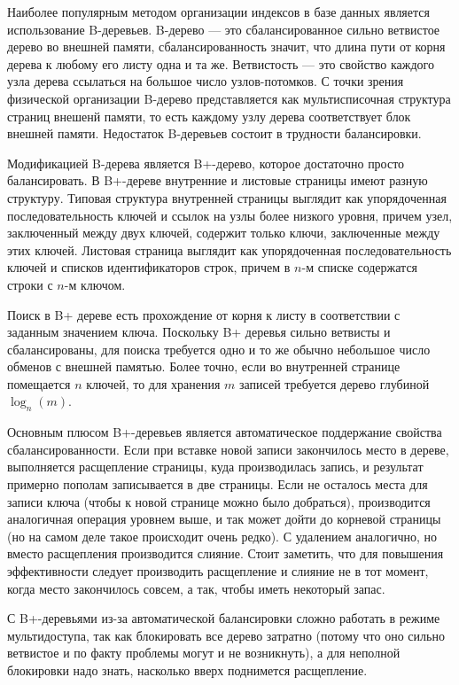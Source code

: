 \documentclass[a4paper,12pt]{article}
\begin{document}
Наиболее популярным методом организации индексов в базе данных является использование
B-деревьев. B-дерево — это сбалансированное сильно ветвистое дерево во внешней памяти,
сбалансированность значит, что длина пути от корня дерева к любому его листу одна и та же.
Ветвистость — это свойство каждого узла дерева ссылаться на большое число узлов-потомков.
С точки зрения физической организации B-дерево представляется как
мультисписочная структура страниц внешенй памяти, то есть каждому узлу дерева
соответствует блок внешней памяти. Недостаток B-деревьев состоит в трудности
балансировки.

Модификацией B-дерева является B+-дерево, которое достаточно просто балансировать. В
B+-дереве внутренние и листовые страницы имеют разную структуру. Типовая структура
внутренней страницы выглядит как упорядоченная последовательность ключей и ссылок на
узлы более низкого уровня, причем узел, заключенный между двух ключей, содержит только
ключи, заключенные между этих ключей. Листовая страница выглядит как упорядоченная
последовательность ключей и списков идентификаторов строк, причем в $n$-м списке
содержатся строки с $n$-м ключом.

Поиск в B+ дереве есть прохождение от корня к листу в соответствии с заданным значением
ключа. Поскольку B+ деревья сильно ветвисты и сбалансированы, для поиска требуется одно
и то же обычно небольшое число обменов с внешней памятью. Более точно, если во
внутренней странице помещается $n$ ключей, то для хранения $m$ записей требуется дерево
глубиной $\log_n(m)$.

Основным плюсом B+-деревьев является автоматическое поддержание свойства
сбалансированности. Если при вставке новой записи закончилось место в дереве, выполняется
расщепление страницы, куда производилась запись, и результат примерно пополам
записывается в две страницы. Если не осталось места для записи ключа (чтобы к новой
странице можно было добраться), производится аналогичная операция уровнем выше, и так
может дойти до корневой страницы (но на самом деле такое происходит очень редко). С
удалением аналогично, но вместо расщепления производится слияние. Стоит заметить, что
для повышения эффективности следует производить расщепление и слияние не в тот момент,
когда место закончилось совсем, а так, чтобы иметь некоторый запас.

С B+-деревьями из-за автоматической балансировки сложно работать в режиме
мультидоступа, так как блокировать все дерево затратно (потому что оно сильно ветвистое и
по факту проблемы могут и не возникнуть), а для неполной блокировки надо знать,
насколько вверх поднимется расщепление.
\end{document}
